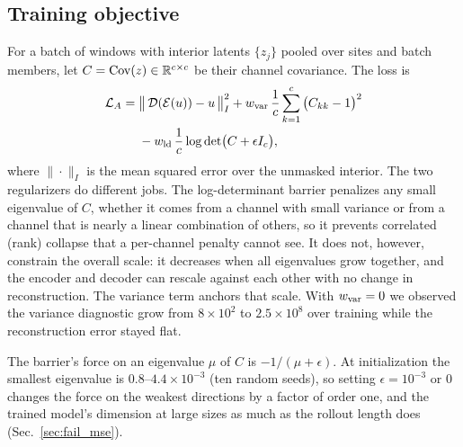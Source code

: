 \subsection{Training objective}
\label{sec:objective}

For a batch of windows with interior latents $\{z_j\}$ pooled over sites
and batch members, let $C = \operatorname{Cov}(z)\in\mathbb{R}^{c\times c}$ be their channel
covariance. The loss is
\begin{equation}
\begin{split}
  \mathcal{L}_A ={}&
  \big\|\,\mathcal{D}(\mathcal{E}(u)) - u\,\big\|^2_{I}
  + w_{\mathrm{var}}\,\frac1c\sum_{k=1}^{c}\big(C_{kk}-1\big)^2\\
  &- w_{\mathrm{ld}}\,\frac1c\log\det\!\big(C + \epsilon I_c\big),
\end{split}
  \label{eq:stageA}
\end{equation}
where $\|\cdot\|_I$ is the mean squared error over the unmasked interior.
The two regularizers do different jobs. The log-determinant barrier
penalizes any small eigenvalue of $C$, whether it comes from a channel
with small variance or from a channel that is nearly a linear combination
of others, so it prevents correlated (rank) collapse that a per-channel
penalty cannot see. It does not, however, constrain the overall scale:
it decreases when all eigenvalues grow together, and the encoder and
decoder can rescale against each other with no change in reconstruction.
The variance term anchors that scale. With $w_{\mathrm{var}}=0$ we observed the
variance diagnostic grow from $8\times10^{2}$ to $2.5\times10^{8}$ over
training while the reconstruction error stayed flat.

\begin{remark}
\label{rem:epsilon}
The barrier's force on an eigenvalue $\mu$ of $C$ is $-1/(\mu+\epsilon)$.
At initialization the smallest eigenvalue is $0.8$--$4.4\times10^{-3}$ (ten
random seeds), so setting $\epsilon=10^{-3}$ or $0$ changes the force on
the weakest directions by a factor of order one, and the trained model's
dimension at large sizes as much as the rollout length does
(Sec.~\ref{sec:fail_mse}).
\end{remark}

